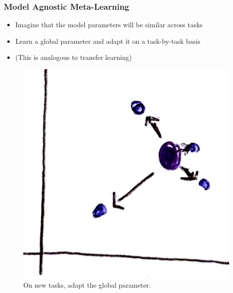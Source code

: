 \documentclass[10pt,mathserif]{beamer}
\begin{document}
\begin{frame}
  \frametitle{Model Agnostic Meta-Learning}
 \begin{itemize}
 \item Imagine that the model parameters will be similar across tasks
 \item Learn a global parameter and adapt it on a task-by-task basis
 \item (This is analogous to transfer learning)
 \end{itemize}
\begin{figure}[ht]
  \centering
  \includegraphics[width=0.4\paperwidth]{figure/maml_global}
  \caption{On new tasks, adapt the global parameter.\label{fig:maml_global} }
\end{figure}
\end{frame}
\end{document}
